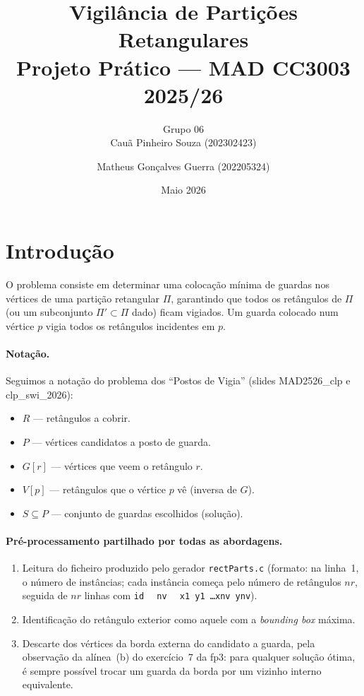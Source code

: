 \documentclass[11pt,a4paper]{article}
\title{Vigilância de Partições Retangulares\\
\large Projeto Prático --- MAD CC3003 2025/26}
\author{Grupo 06\\
Cauã Pinheiro Souza (202302423) \and Matheus Gonçalves Guerra (202205324)}
\date{Maio 2026}
\begin{document}
\maketitle

\section{Introdução}

O problema consiste em determinar uma colocação mínima de guardas
nos vértices de uma partição retangular $\Pi$, garantindo que todos
os retângulos de $\Pi$ (ou um subconjunto $\Pi' \subset \Pi$ dado)
ficam vigiados. Um guarda colocado num vértice $p$ vigia todos os
retângulos incidentes em $p$.

\paragraph{Notação.} Seguimos a notação do problema dos
``Postos de Vigia'' (slides MAD2526\_clp e clp\_swi\_2026):
\begin{itemize}[noitemsep]
  \item $R$ --- retângulos a cobrir.
  \item $P$ --- vértices candidatos a posto de guarda.
  \item $G[r]$ --- vértices que veem o retângulo $r$.
  \item $V[p]$ --- retângulos que o vértice $p$ vê (inversa de $G$).
  \item $S \subseteq P$ --- conjunto de guardas escolhidos (solução).
\end{itemize}

\paragraph{Pré-processamento partilhado por todas as abordagens.}
\begin{enumerate}[noitemsep,topsep=2pt]
  \item Leitura do ficheiro produzido pelo gerador \texttt{rectParts.c}
    (formato: na linha~1, o número de instâncias; cada instância
    começa pelo número de retângulos $nr$, seguida de $nr$ linhas
    com \texttt{id $\;$ nv $\;$ x1 y1 \dots xnv ynv}).
  \item Identificação do retângulo exterior como aquele com a
    \emph{bounding box} máxima.
  \item Descarte dos vértices da borda externa do candidato a guarda,
    pela observação da alínea~(b) do exercício~7 da fp3:
    para qualquer solução ótima, é sempre possível trocar um guarda
    da borda por um vizinho interno equivalente.
\end{enumerate}
\end{document}
